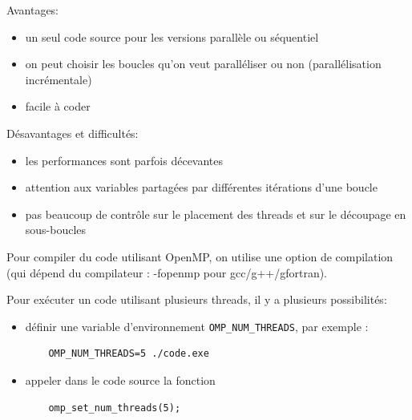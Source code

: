 \documentclass{beamer}
\begin{document}
\begin{frame}

Avantages:
\begin{itemize}
	\item un seul code source pour les versions parallèle ou séquentiel
	\item on peut choisir les boucles qu'on veut paralléliser ou non (parallélisation incrémentale)
	\item facile à coder
\end{itemize}
\vfill

Désavantages et difficultés:
\begin{itemize}
	\item les performances sont parfois décevantes
	\item attention aux variables partagées par différentes itérations d'une boucle
	\item pas beaucoup de contrôle sur le placement des threads et sur le découpage en sous-boucles
\end{itemize}

\end{frame}

\begin{frame}[fragile]

Pour compiler du code utilisant OpenMP, on utilise une option de compilation (qui dépend du compilateur : -fopenmp pour gcc/g++/gfortran).

\vfill
Pour exécuter un code utilisant plusieurs threads, il y a plusieurs possibilités:
\begin{itemize}
	\item définir une variable d'environnement \verb|OMP_NUM_THREADS|, par exemple :
	\begin{lstlisting}
	OMP_NUM_THREADS=5 ./code.exe
	\end{lstlisting}
	\item appeler dans le code source la fonction
	\begin{lstlisting}
	omp_set_num_threads(5);
	\end{lstlisting}
\end{itemize}
\vfill
\end{frame}
\end{document}
